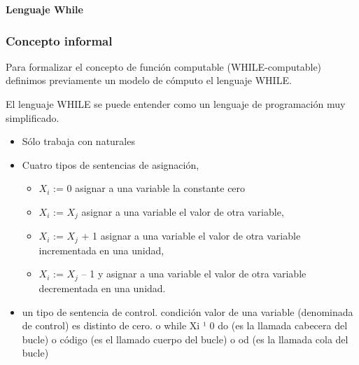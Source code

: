 \documentclass[xcolor=table]{beamer}
\begin{document}
\begin{frame}  \Large

\begin{center}
    \textbf{Lenguaje While}
\end{center}

\end{frame} 

\begin{frame} \frametitle{Concepto informal} \footnotesize  
Para formalizar el concepto de función computable (WHILE-computable) definimos previamente un modelo de cómputo el lenguaje WHILE.

El lenguaje WHILE se puede entender como un lenguaje de programación muy simplificado.
\begin{itemize}
    \item Sólo trabaja con naturales
    \item Cuatro tipos de sentencias de asignación,
        \begin{itemize}
        \item ${X_i}$ := 0 asignar a una variable la constante cero
        \item ${X_i}$ := ${X_j}$ asignar a una variable el valor de otra variable,
        \item ${X_i}$ := ${X_j}$ + 1 asignar a una variable el valor de otra variable incrementada en una unidad,
        \item ${X_i}$ := ${X_j}$ – 1 y asignar a una variable el valor de otra variable decrementada en una unidad.
        \end{itemize}

  \item un tipo de sentencia de control. condición valor de una variable (denominada de control) es distinto de cero.
o while Xi ¹ 0 do (es la llamada cabecera del bucle)
o código (es el llamado cuerpo del bucle)
o od (es la llamada cola del bucle)
\end{itemize}

\end{frame} 





\end{document}
